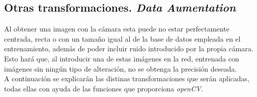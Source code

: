 \subsection{Otras transformaciones. \textit{Data Aumentation}}
Al obtener una imagen con la cámara esta puede no estar perfectamente centrada, recta o con un tamaño igual al de la base de datos empleada en el entrenamiento, además de poder incluir ruido introducido por la propia cámara. Esto hará que, al introducir una de estas imágenes en la red, entrenada con imágenes sin ningún tipo de alteración, no se obtenga la precisión deseada.\\

A continuación se explicarán las distinas transformaciones que serán aplicadas, todas ellas con ayuda de las funciones que proporciona \textit{openCV}.
\vspace{10pt}
